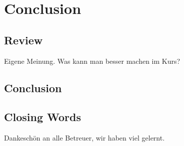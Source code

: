\chapter{Conclusion}
\section{Review}
Eigene Meinung. Was kann man besser machen im Kurs?

\section{Conclusion}

\section{Closing Words}
Dankeschön an alle Betreuer, wir haben viel gelernt.